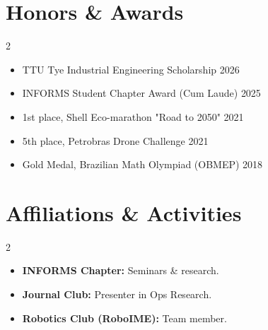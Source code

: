 \documentclass[letterpaper,10pt]{article}
\newcommand{\dategray}[1]{\textcolor{textgray}{#1}}
\begin{document}
\section{Honors \& Awards}
\vspace{-6pt}
\begin{multicols}{2}
\begin{itemize}[leftmargin=14pt, nosep, itemsep=1pt]
    \item TTU Tye Industrial Engineering Scholarship \hfill \dategray{2026}
    \item INFORMS Student Chapter Award (Cum Laude) \hfill \dategray{2025}
    \item 1st place, Shell Eco-marathon "Road to 2050" \hfill \dategray{2021}
    \item 5th place, Petrobras Drone Challenge \hfill \dategray{2021}
    \item Gold Medal, Brazilian Math Olympiad (OBMEP) \hfill \dategray{2018}
\end{itemize}
\end{multicols}
\vspace{-6pt}

\section{Affiliations \& Activities}
\vspace{-6pt}
\begin{multicols}{2}
\begin{itemize}[leftmargin=14pt, nosep, itemsep=1pt]
    \item \textbf{INFORMS Chapter:} Seminars \& research.
    \item \textbf{Journal Club:} Presenter in Ops Research.
    \item \textbf{Robotics Club (RoboIME):} Team member.
\end{itemize}
\end{multicols}
\vspace{-6pt}

\end{document}

